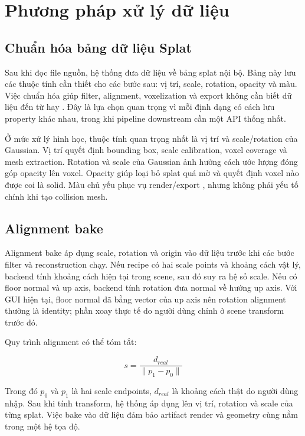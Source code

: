 \section{Phương pháp xử lý dữ liệu}

\subsection{Chuẩn hóa bảng dữ liệu Splat}

Sau khi đọc file nguồn, hệ thống đưa dữ liệu về bảng splat nội bộ. Bảng này lưu các thuộc tính cần thiết cho các bước sau: vị trí, scale, rotation, opacity và màu. Việc chuẩn hóa giúp filter, alignment, voxelization và export không cần biết dữ liệu đến từ  hay . Đây là lựa chọn quan trọng vì mỗi định dạng có cách lưu property khác nhau, trong khi pipeline downstream cần một API thống nhất.

Ở mức xử lý hình học, thuộc tính quan trọng nhất là vị trí và scale/rotation của Gaussian. Vị trí quyết định bounding box, scale calibration, voxel coverage và mesh extraction. Rotation và scale của Gaussian ảnh hưởng cách ước lượng đóng góp opacity lên voxel. Opacity giúp loại bỏ splat quá mờ và quyết định voxel nào được coi là solid. Màu chủ yếu phục vụ render/export , nhưng không phải yếu tố chính khi tạo collision mesh.

\subsection{Alignment bake}

Alignment bake áp dụng scale, rotation và origin vào dữ liệu trước khi các bước filter và reconstruction chạy. Nếu recipe có hai scale points và khoảng cách vật lý, backend tính khoảng cách hiện tại trong scene, sau đó suy ra hệ số scale. Nếu có floor normal và up axis, backend tính rotation đưa normal về hướng up axis. Với GUI hiện tại, floor normal đã bằng vector của up axis nên rotation alignment thường là identity; phần xoay thực tế do người dùng chỉnh ở scene transform trước đó.

Quy trình alignment có thể tóm tắt:

\[
s = \frac{d_{real}}{\|p_1 - p_0\|}
\]

Trong đó $p_0$ và $p_1$ là hai scale endpoints, $d_{real}$ là khoảng cách thật do người dùng nhập. Sau khi tính transform, hệ thống áp dụng lên vị trí, rotation và scale của từng splat. Việc bake vào dữ liệu đảm bảo artifact render và geometry cùng nằm trong một hệ tọa độ.

